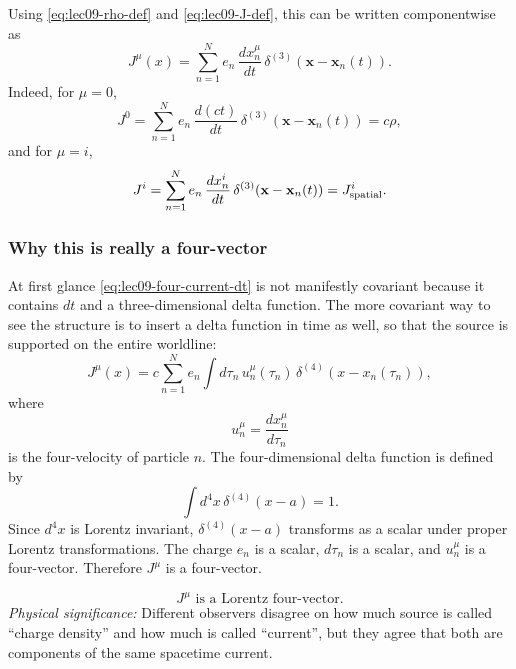 Using \eqref{eq:lec09-rho-def} and \eqref{eq:lec09-J-def}, this can be written
componentwise as
\begin{equation}\label{eq:lec09-four-current-dt}
  \boxed{
  J^\mu(x)
  =
  \sum_{n=1}^N e_n\,
  \frac{dx_n^\mu}{dt}\,
  \delta^{(3)}\!\left(\mathbf{x}-\mathbf{x}_n(t)\right).
  }
\end{equation}
Indeed, for $\mu=0$,
\begin{equation}\label{eq:lec09-J0-check}
  J^0
  =
  \sum_{n=1}^N e_n\,\frac{d(ct)}{dt}\,
  \delta^{(3)}\!\left(\mathbf{x}-\mathbf{x}_n(t)\right)
  =
  c\rho,
\end{equation}
and for $\mu=i$,
\begin{equation}\label{eq:lec09-Ji-check}
  J^i
  =
  \sum_{n=1}^N e_n\,\frac{dx_n^i}{dt}\,
  \delta^{(3)}\!\left(\mathbf{x}-\mathbf{x}_n(t)\right)
  =
  J^i_{\rm spatial}.
\end{equation}

\subsubsection*{Why this is really a four-vector}

At first glance \eqref{eq:lec09-four-current-dt} is not manifestly covariant
because it contains $dt$ and a three-dimensional delta function.  The more
covariant way to see the structure is to insert a delta function in time as
well, so that the source is supported on the entire worldline:
\begin{equation}\label{eq:lec09-current-covariant}
  \boxed{
  J^\mu(x)
  =
  c\sum_{n=1}^N e_n\int d\tau_n\,
  u_n^\mu(\tau_n)\,
  \delta^{(4)}\!\left(x-x_n(\tau_n)\right),
  }
\end{equation}
where
\begin{equation}\label{eq:lec09-four-velocity}
  u_n^\mu=\frac{dx_n^\mu}{d\tau_n}
\end{equation}
is the four-velocity of particle $n$.  The four-dimensional delta function is
defined by
\begin{equation}\label{eq:lec09-delta4-def}
  \int d^4x\,\delta^{(4)}(x-a)=1.
\end{equation}
Since $d^4x$ is Lorentz invariant, $\delta^{(4)}(x-a)$ transforms as a scalar
under proper Lorentz transformations.  The charge $e_n$ is a scalar, $d\tau_n$
is a scalar, and $u_n^\mu$ is a four-vector.  Therefore $J^\mu$ is a
four-vector.

\begin{equation}\label{eq:lec09-J-vector-result}
  \boxed{J^\mu \text{ is a Lorentz four-vector.}}
\end{equation}
\textit{Physical significance:} Different observers disagree on how much source
is called ``charge density'' and how much is called ``current'', but they agree
that both are components of the same spacetime current.

